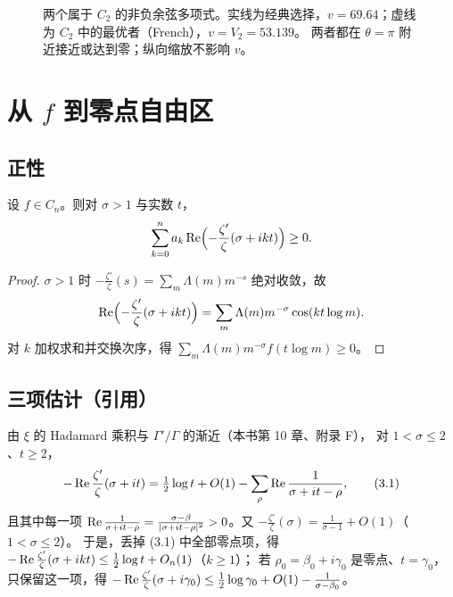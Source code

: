 \documentclass[11pt]{article}
\begin{document}
\begin{figure}[H]
\centering
{}
\caption{两个属于 $C_2$ 的非负余弦多项式。实线为经典选择，$v=69.64$；虚线为 $C_2$ 中的最优者（French），$v=V_2=53.139$。
两者都在 $\theta=\pi$ 附近接近或达到零；纵向缩放不影响 $v$。}
\label{fig:poly}
\end{figure}

\section{从 $f$ 到零点自由区}
\subsection{正性}
\begin{proposition}\label{prop:pos}
设 $f\in C_n$。则对 $\sigma>1$ 与实数 $t$，
\[
 \sum_{k=0}^na_k\operatorname{Re}\Bigl(-\frac{\zeta'}{\zeta}(\sigma+ikt)\Bigr)\ge0 .
\]
\end{proposition}
\begin{proof}
$\sigma>1$ 时 $-\frac{\zeta'}{\zeta}(s)=\sum_m\Lambda(m)m^{-s}$ 绝对收敛，故
\[
 \operatorname{Re}\Bigl(-\frac{\zeta'}{\zeta}(\sigma+ikt)\Bigr)=\sum_m\Lambda(m)m^{-\sigma}\cos(kt\log m).
\]
对 $k$ 加权求和并交换次序，得 $\sum_m\Lambda(m)m^{-\sigma}f(t\log m)\ge0$。
\end{proof}

\subsection{三项估计（引用）}
由 $\xi$ 的 Hadamard 乘积与 $\Gamma'/\Gamma$ 的渐近（本书第 10 章、附录 F），
对 $1<\sigma\le2$、$t\ge2$，
\begin{equation}
 -\operatorname{Re}\frac{\zeta'}{\zeta}(\sigma+it)=\tfrac12\log t+O(1)-\sum_\rho\operatorname{Re}\frac1{\sigma+it-\rho},     \tag{3.1}
\end{equation}
且其中每一项 $\operatorname{Re}\frac1{\sigma+it-\rho}=\frac{\sigma-\beta}{|\sigma+it-\rho|^2}>0$。又
$-\frac{\zeta'}{\zeta}(\sigma)=\frac1{\sigma-1}+O(1)$（$1<\sigma\le2$）。
于是，丢掉 (3.1) 中全部零点项，得 $-\operatorname{Re}\frac{\zeta'}{\zeta}(\sigma+ikt)\le\frac12\log t+O_n(1)$（$k\ge1$）；
若 $\rho_0=\beta_0+i\gamma_0$ 是零点、$t=\gamma_0$，只保留这一项，得
$-\operatorname{Re}\frac{\zeta'}{\zeta}(\sigma+i\gamma_0)\le\frac12\log\gamma_0+O(1)-\frac1{\sigma-\beta_0}$。
\end{document}
